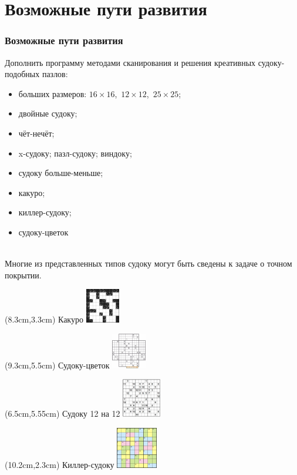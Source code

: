 \documentclass{beamer}
\begin{document}
\section{Возможные пути развития}
\begin{frame}
\frametitle{Возможные пути развития}
Дополнить программу методами сканирования и решения креативных судоку-подобных пазлов:
\begin{itemize}
	\item больших размеров: $16\times16$, \,$12\times12$, \,$25\times25$;
	\item двойные судоку;
	\item чёт-нечёт;
	\item x-судоку; пазл-судоку; виндоку;
	\item судоку больше-меньше;
	\item какуро;
	\item киллер-судоку;
	\item судоку-цветок
\end{itemize}
\ \\
Многие из представленных типов судоку могут быть сведены к задаче о точном покрытии.

\begin{textblock*}{1.5cm}(8.3cm,3.3cm)
\tiny Какуро
\includegraphics[width=1.5cm]{kakuro.jpg}
\end{textblock*}

\begin{textblock*}{1.5cm}(9.3cm,5.5cm)
\tiny Судоку-цветок
\includegraphics[width=1.5cm]{sudoku_flower}
\end{textblock*}

\begin{textblock*}{1.7cm}(6.5cm,5.55cm)
\tiny Судоку 12 на 12
\includegraphics[width=1.7cm]{sudoku12}
\end{textblock*}

\begin{textblock*}{1.8cm}(10.2cm,2.3cm)
\tiny Киллер-судоку
\includegraphics[width=1.8cm]{sudoku_killer}
\end{textblock*}


\end{frame}
\end{document}
